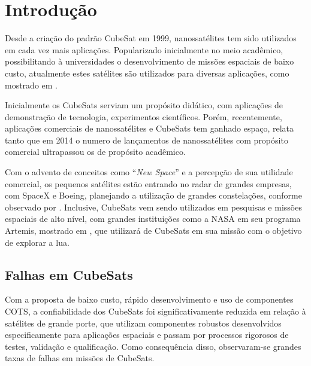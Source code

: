 \chapter{Introdução}\label{cap:intro}

Desde a criação do padrão CubeSat em 1999, nanossatélites tem sido utilizados em cada vez mais aplicações. Popularizado inicialmente no meio acadêmico, possibilitando à universidades o desenvolvimento de missões espaciais de baixo custo, atualmente estes satélites são utilizados para diversas aplicações, como mostrado em \textcite{modern-small-sats-economics}.

Inicialmente os CubeSats serviam um propósito didático, com aplicações de demonstração de tecnologia, experimentos científicos.
Porém, recentemente, aplicações comerciais de nanossatélites e CubeSats tem ganhado espaço, relata \textcite{modern-small-sats-economics} tanto que em 2014 o numero de lançamentos de nanossatélites com propósito comercial ultrapassou os de propósito acadêmico.

Com o advento de conceitos como “\textit{New Space}” e a percepção de sua utilidade comercial, os pequenos satélites estão entrando no radar de grandes empresas, com SpaceX e Boeing, planejando a utilização de grandes constelações, conforme observado por \textcite{modern-small-sats-economics}.
Inclusive, CubeSats vem sendo utilizados em pesquisas e missões espaciais de alto nível, com grandes instituições como a NASA em seu programa Artemis, mostrado em \textcite{artemis-plan}, que utilizará de CubeSats em sua missão com o objetivo de explorar a lua.

\section{Falhas em CubeSats}\label{sec:intro-falhas}

Com a proposta de baixo custo, rápido desenvolvimento e uso de componentes \gls{COTS}, a confiabilidade dos CubeSats foi significativamente reduzida em relação à satélites de grande porte, que utilizam componentes robustos desenvolvidos especificamente para aplicações espaciais e passam por processos rigorosos de testes, validação e qualificação.
Como consequência disso, observaram-se grandes taxas de falhas em missões de CubeSats.

